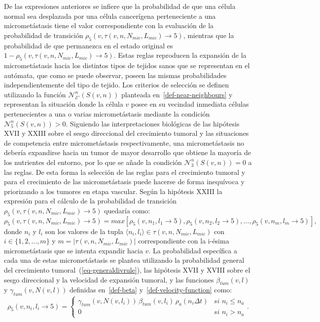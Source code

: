 De las expresiones anteriores se infiere que la probabilidad de que una c\'elula normal sea desplazada por una c\'elula cancer\'igena perteneciente a una micromet\'astasis tiene el valor correspondiente con la evaluaci\'on de la probabilidad de transici\'on $\rho_5(v,\tau(v,n,N_{mic},L_{mic}) \rightarrow 5)$, mientras que la probabilidad de que permanezca en el estado original es $1-\rho_5(v,\tau(v,n,N_{mic},L_{mic}) \rightarrow 5)$. Estas reglas reproducen la expansi\'on de la micromet\'astasis hacia los distintos tipos de tejidos sanos que se representan en el aut\'omata, que como se puede observar, poseen las mismas probabilidades independientemente del tipo de tejido. Los criterios de selecci\'on se definen utilizando la funci\'on $\mathcal{N}_{\mathcal{E'}}^n(S(v,n))$ planteada en~\ref{def-near-neighbours} y representan la situaci\'on donde la c\'elula $v$ posee en su vecindad inmediata c\'elulas pertenecientes a una o varias micromet\'astasis mediante la condici\'on $\mathcal{N}_5^n(S(v,n)) > 0$. Siguiendo las interpretaciones biol\'ogicas de las hip\'otesis XVII y XXIII sobre el sesgo direccional del crecimiento tumoral y las situaciones de competencia entre micromet\'astasis respectivamente, una micromet\'astasis no deber\'ia expandirse hacia un tumor de mayor desarrollo que obtiene la mayor\'ia de los nutrientes del entorno, por lo que se a\~nade la condici\'on $\mathcal{N}_3^n(S(v,n))=0$ a las reglas. De esta forma la selecci\'on de las reglas para el crecimiento tumoral y para el crecimiento de las micromet\'astasis puede hacerse de forma inequ\'ivoca y priorizando a los tumores en etapa vascular. Seg\'un la hip\'otesis XXIII la expresi\'on para el c\'alculo de la probabilidad de transici\'on $\rho_5(v,\tau(v,n,N_{mic},L_{mic}) \rightarrow 5)$ quedar\'ia como:
\begin{equation}
\rho_5(v,\tau(v,n,N_{mic},L_{mic}) \rightarrow 5) = max[\rho_5(v,n_1,l_1 \rightarrow 5),\rho_5(v,n_2,l_2 \rightarrow 5),\ldots, \rho_5(v,n_m,l_m \rightarrow 5)], 
\end{equation}
donde $n_i$ y $l_i$ son los valores de la tupla $\langle n_i, l_i \rangle \in \tau(v,n,N_{mic},L_{mic})$ con $i \in \lbrace 1,2,\ldots,m \rbrace$ y $m=|\tau(v,n,N_{mic},L_{mic})|$ correspondiente con la i-\'esima micromet\'astasis que se intenta expandir hacia $v$. La probabilidad espec\'ifica a cada una de estas micromet\'astasis se plantea utilizando la probabilidad general del crecimiento tumoral~(\ref{eq-generaldivrule}), las hip\'otesis XVII y XVIII sobre el sesgo direccional y la velocidad de expansi\'on tumoral, y las funciones $\beta_{tum}(v,l)$ y $\gamma_{tum}(v,N(v,l))$ definidas en~\ref{def-beta} y~\ref{def-velocity-function} como:
\begin{equation}
\rho_5(v,n_i,l_i \rightarrow 5) = \left\lbrace
	\begin{array}{ll}
		\gamma_{tum}(v,N(v,l_i))\,\beta_{tum}(v,l_i)\,\rho_a(n_i \Delta t)& \textit{si } n_i \leq n_a \\
		0& \textit{si } n_i > n_a
	\end{array}
\right.. \label{eq-rho-5}
\end{equation}

